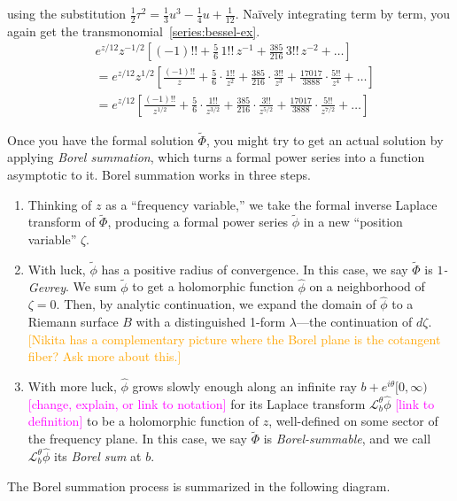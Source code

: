 \documentclass{article}
\newcommand{\series}[1]{\tilde{#1}}
\newcommand{\laplace}{\mathcal{L}}
\begin{document}
using the substitution $\tfrac{1}{2} \tau^2 = \tfrac{1}{3} u^3 - \tfrac{1}{4} u + \tfrac{1}{12}$. Na\"{i}vely integrating term by term, you again get the transmonomial~\eqref{series:bessel-ex}.
\color{DodgerBlue}
\begin{align*}
& e^{z/12} z^{-1/2} \left[ (-1)!! + \frac{5}{6}\,1!!\,z^{-1} + \frac{385}{216}\,3!!\,z^{-2} + \ldots \right] \\
& = e^{z/12} z^{1/2} \left[ \frac{(-1)!!}{z} + \frac{5}{6} \cdot \frac{1!!}{z^2} + \frac{385}{216} \cdot \frac{3!!}{z^3} + \frac{17017}{3888} \cdot \frac{5!!}{z^4} + \ldots \right] \\
& = e^{z/12} \left[ \frac{(-1)!!}{z^{1/2}} + \frac{5}{6} \cdot \frac{1!!}{z^{3/2}} + \frac{385}{216} \cdot \frac{3!!}{z^{5/2}} + \frac{17017}{3888} \cdot \frac{5!!}{z^{7/2}} + \ldots \right]
\end{align*}
\color{black}

Once you have the formal solution $\series{\Phi}$, you might try to get an actual solution by applying {\em Borel summation}, which turns a formal power series into a function asymptotic to it. Borel summation works in three steps.
\begin{enumerate}
\item Thinking of $z$ as a ``frequency variable,'' we take the formal inverse Laplace transform of $\series{\Phi}$, producing a formal power series $\series{\phi}$ in a new ``position variable'' $\zeta$.
\item With luck, $\series{\phi}$ has a positive radius of convergence. In this case, we say $\series{\Phi}$ is {\em $1$-Gevrey}. We sum $\series{\phi}$ to get a holomorphic function $\hat{\phi}$ on a neighborhood of $\zeta = 0$. Then, by analytic continuation, we expand the domain of $\hat{\phi}$ to a Riemann surface $B$ with a distinguished 1-form $\lambda$---the continuation of $d\zeta$. \textcolor{orange}{[Nikita has a complementary picture where the Borel plane is the cotangent fiber? Ask more about this.]}
\item With more luck, $\hat{\phi}$ grows slowly enough along an infinite ray $b + e^{i\theta}[0, \infty)$ \textcolor{magenta}{[change, explain, or link to notation]} for its Laplace transform $\laplace_b^\theta \hat{\phi}$ \textcolor{magenta}{[link to definition]} to be a holomorphic function of $z$, well-defined on some sector of the frequency plane. In this case, we say $\tilde{\Phi}$ is {\em Borel-summable}, and we call $\laplace_b^\theta \hat{\phi}$ its {\em Borel sum} at $b$.
\end{enumerate}
The Borel summation process is summarized in the following diagram.
\begin{center}
\end{center}
\end{document}
